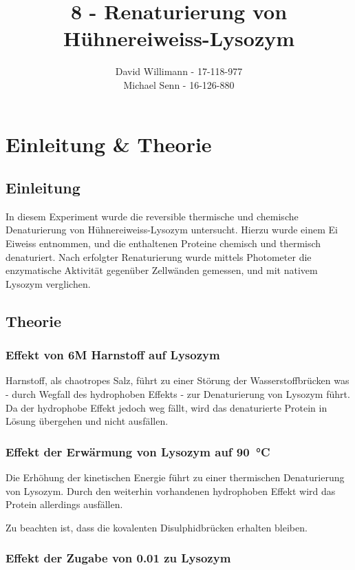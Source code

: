 \documentclass[a4paper,german]{scrreprt}
\title{8 - Renaturierung von Hühnereiweiss-Lysozym}
\author{David Willimann \maillink{david.willimann@students.unibe.ch} - 17-118-977 \\ Michael Senn \maillink{michael.senn@students.unibe.ch} - 16-126-880}
\date{\printdate}
\begin{document}
\maketitle

\chapter{Einleitung \& Theorie}

\section{Einleitung}

In diesem Experiment wurde die reversible thermische und chemische
Denaturierung von Hühnereiweiss-Lysozym untersucht. Hierzu wurde einem Ei
Eiweiss entnommen, und die enthaltenen Proteine chemisch und thermisch
denaturiert. Nach erfolgter Renaturierung wurde mittels Photometer die
enzymatische Aktivität gegenüber Zellwänden gemessen, und mit nativem Lysozym
verglichen.

\section{Theorie}

\subsection{Effekt von 6M Harnstoff auf Lysozym}

Harnstoff, als chaotropes Salz, führt zu einer Störung der Wasserstoffbrücken
was - durch Wegfall des hydrophoben Effekts - zur Denaturierung von Lysozym
führt. Da der hydrophobe Effekt jedoch weg fällt, wird das denaturierte Protein
in Lösung übergehen und nicht ausfällen.

\subsection{Effekt der Erwärmung von Lysozym auf \SI[detect-weight]{90}{\celsius}}

Die Erhöhung der kinetischen Energie führt zu einer thermischen Denaturierung
von Lysozym. Durch den weiterhin vorhandenen hydrophoben Effekt wird das
Protein allerdings ausfällen.

Zu beachten ist, dass die kovalenten Disulphidbrücken erhalten bleiben.

\subsection{Effekt der Zugabe von \SI[detect-weight]{0.01}{\Molar}  zu Lysozym}
\end{document}
